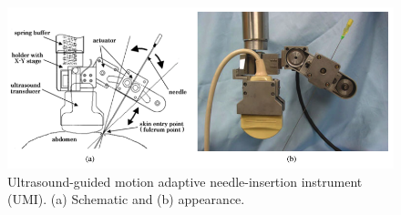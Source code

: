 \begin{figure}
	\includegraphics[width=\textwidth]{images/UMI.png}
	\caption[UMI schema]{Ultrasound-guided motion adaptive needle-insertion instrument (UMI). (a) Schematic and (b) appearance. \cite{Hong2004}}
	\label{fig:umi}
\end{figure}

